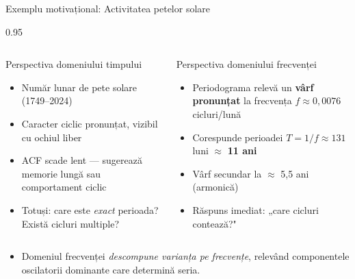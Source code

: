 \documentclass[9pt, aspectratio=169, t]{beamer}
\begin{document}
\begin{frame}{Exemplu motivațional: Activitatea petelor solare}
    \begin{cminipage}{0.95\textwidth}
    \vspace{-2mm}
    \begin{columns}[T]
        \begin{block}{Perspectiva domeniului timpului}
            \begin{itemize}\setlength{\itemsep}{0pt}
                \item Număr lunar de pete solare (1749--2024)
                \item Caracter ciclic pronunțat, vizibil cu ochiul liber
                \item ACF scade lent --- sugerează memorie lungă sau comportament ciclic
                \item Totuși: care este \textit{exact} perioada? Există cicluri multiple?
            \end{itemize}
        \end{block}

        \begin{block}{Perspectiva domeniului frecvenței}
            \begin{itemize}\setlength{\itemsep}{0pt}
                \item Periodograma relevă un \textbf{vârf pronunțat} la frecvența $f \approx 0{,}0076$ cicluri/lună
                \item Corespunde perioadei $T = 1/f \approx 131$ luni $\approx$ \textbf{11 ani}
                \item Vârf secundar la $\approx$ 5,5 ani (armonică)
                \item Răspuns imediat: „care cicluri contează?"
            \end{itemize}
        \end{block}
    \end{columns}
    \vspace{2mm}
    \begin{itemize}\setlength{\itemsep}{0pt}
        \item[\textbf{Observație cheie}:] Domeniul frecvenței \textit{descompune varianța pe frecvențe}, relevând componentele oscilatorii dominante care determină seria.
    \end{itemize}
    \end{cminipage}
\end{frame}
\end{document}
